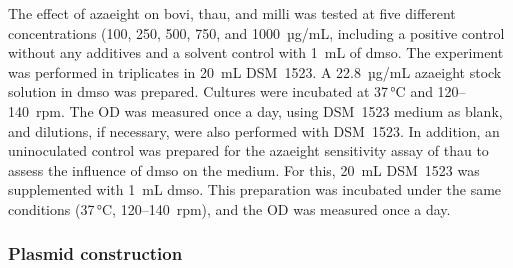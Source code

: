 The effect of \acrshort{azaeight} on \acrshort{bovi}, \acrshort{thau}, and \acrshort{milli} was tested at five different concentrations (100, 250, 500, 750, and 1000~µg/mL, including a positive control without any additives and a solvent control with 1~mL of \acrshort{dmso}. The experiment was performed in triplicates in 20~mL DSM~1523. A 22.8~µg/mL \acrshort{azaeight} stock solution in \acrshort{dmso} was prepared. Cultures were incubated at 37\,°C and 120--140~rpm. The \acrshort{OD} was measured once a day, using DSM~1523 medium as blank, and dilutions, if necessary, were also performed with DSM~1523.
In addition, an uninoculated control was prepared for the \acrshort{azaeight} sensitivity assay of \acrshort{thau} to assess the influence of \acrshort{dmso} on the medium. For this, 20~mL DSM~1523 was supplemented with 1~mL \acrshort{dmso}. This preparation was incubated under the same conditions (37\,°C, 120--140~rpm), and the \acrshort{OD} was measured once a day.

\subsubsection{Plasmid construction}

